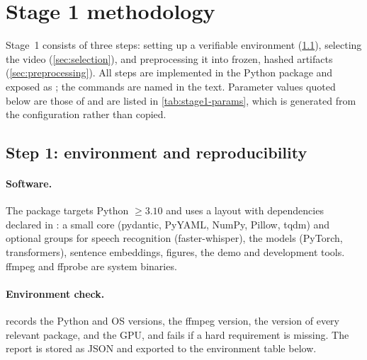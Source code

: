 \section{Stage 1 methodology}\label{sec:stage1}

Stage~1 consists of three steps: setting up a verifiable environment
(\cref{sec:env}), selecting the video (\cref{sec:selection}),
and preprocessing it into frozen, hashed artifacts
(\cref{sec:preprocessing}). All steps are implemented in the \memvid{} Python
package and exposed as ; the commands are named in
the text. Parameter values quoted below are those of
 and are listed in \cref{tab:stage1-params}, which is
generated from the configuration rather than copied.

\subsection{Step 1: environment and reproducibility}\label{sec:env}

\paragraph{Software.}
The package targets Python $\ge 3.10$ and uses a  layout with
dependencies declared in : a small core (pydantic,
PyYAML, NumPy, Pillow, tqdm) and optional groups for speech recognition
(faster-whisper), the models (PyTorch, transformers), sentence embeddings,
figures, the demo and development tools. ffmpeg and ffprobe are system
binaries.

\paragraph{Environment check.}
 records the Python and OS versions, the ffmpeg version,
the version of every relevant package, and the GPU, and fails if a hard
requirement is missing. The report is stored as JSON and exported to the
environment table below.

